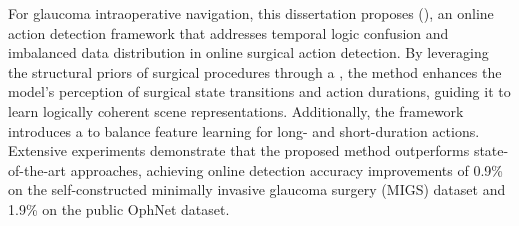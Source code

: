 \begin{abstractEN}
For glaucoma intraoperative navigation, this dissertation proposes \fulltwoen (\sexytwo), 
an online action detection framework that addresses temporal logic confusion 
and imbalanced data distribution in online surgical action detection.
By leveraging the structural priors of surgical procedures through a \graphmodulefullen, 
the method enhances the model's perception of surgical state transitions and action durations,
guiding it to learn logically coherent scene representations.
Additionally, the framework introduces a \lossfullen to balance feature learning for long- and short-duration actions.
Extensive experiments demonstrate that the proposed method outperforms state-of-the-art approaches, 
achieving online detection accuracy improvements of 0.9\% on 
the self-constructed minimally invasive glaucoma surgery (MIGS) dataset and 1.9\% on the public OphNet dataset.

\end{abstractEN}

